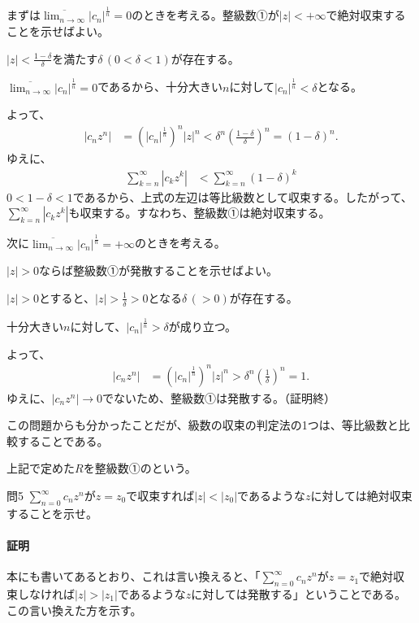 まずは$\displaystyle\overline{\lim_{n\to\infty}}|c_n|^{\frac{1}{n}}=0$のときを考える。整級数①が$|z|<+\infty$で絶対収束することを示せばよい。

$|z|<\frac{1-\delta}{\delta}$を満たす$\delta\,(0<\delta<1)$が存在する。

$\displaystyle\overline{\lim_{n\to\infty}}|c_n|^{\frac{1}{n}}=0$であるから、十分大きい$n$に対して$|c_n|^\frac{1}{n}<\delta$となる。

よって、
\begin{align*}
    |c_nz^n|&=\left(|c_n|^\frac{1}{n}\right)^n|z|^n<\delta^n\left(\frac{1-\delta}{\delta}\right)^n
    =(1-\delta)^n.
\end{align*}
ゆえに、
\begin{align*}
    \sum_{k=n}^\infty |c_kz^k|&<\sum_{k=n}^\infty(1-\delta)^k
\end{align*}
$0<1-\delta<1$であるから、上式の左辺は等比級数として収束する。したがって、$\sum_{k=n}^\infty |c_kz^k|$も収束する。すなわち、整級数①は絶対収束する。

次に$\displaystyle\overline{\lim_{n\to\infty}}|c_n|^{\frac{1}{n}}=+\infty$のときを考える。

$|z|>0$ならば整級数①が発散することを示せばよい。

$|z|>0$とすると、$|z|>\frac{1}{\delta}>0$となる$\delta\,(>0)$が存在する。

十分大きい$n$に対して、$|c_n|^\frac{1}{n}>\delta$が成り立つ。

よって、
\begin{align*}
    |c_nz^n|&=\left(|c_n|^\frac{1}{n}\right)^n|z|^n>\delta^n\left(\frac{1}{\delta}\right)^n
    =1.
\end{align*}
ゆえに、$|c_nz^n|\to 0$でないため、整級数①は発散する。（証明終）

この問題からも分かったことだが、級数の収束の判定法の1つは、等比級数と比較することである。

上記で定めた$R$を整級数①のという。


\begin{mysimplebox}{問5}
    $\sum_{n=0}^\infty c_nz^n$が$z=z_0$で収束すれば$|z|<|z_0|$であるような$z$に対しては絶対収束することを示せ。
\end{mysimplebox}
\paragraph{証明}
本にも書いてあるとおり、これは言い換えると、「$\sum_{n=0}^\infty c_nz^n$が$z=z_1$で絶対収束しなければ$|z|>|z_1|$であるような$z$に対しては発散する」ということである。この言い換えた方を示す。

